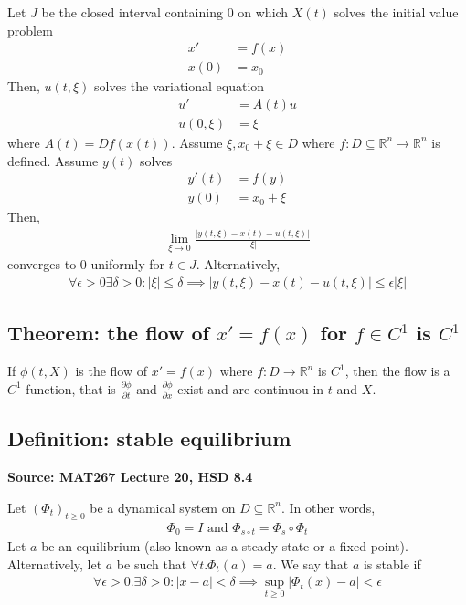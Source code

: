 \documentclass[11pt]{article}
\newcommand{\R}{\mathbb{R}}
\begin{document}
Let $J$ be the closed interval containing $0$ on which $X(t)$ solves the initial value problem 
\begin{align*}
    x' &= f(x) \\
    x(0) &= x_0
\end{align*}
Then, $u(t, \xi)$ solves the variational equation 
\begin{align*}
    u' &= A(t) u \\
    u(0, \xi) &= \xi 
\end{align*}
where $A(t) = Df(x(t))$. Assume $\xi, x_0 + \xi \in D$ where $f: D \subseteq \R^n \to \R^n$ is defined. Assume $y(t)$ solves 
\begin{align*}
    y'(t) &= f(y) \\
    y(0) &= x_0 + \xi 
\end{align*}
Then, 
\begin{align*}
    \lim_{\xi \to 0} \frac{|y(t, \xi) - x(t) - u(t, \xi)|}{|\xi|}
\end{align*}
converges to 0 uniformly for $t \in J$. Alternatively, 
\begin{align*}
    \forall \epsilon > 0 \exists \delta > 0 : |\xi| \leq \delta \implies |y(t, \xi) - x(t) - u(t, \xi)| \leq \epsilon |\xi| \tag{$\forall t \in J$}
\end{align*}

\subsection{Theorem: the flow of $x' = f(x)$ for $f \in C^1$ is $C^1$}
If $\phi(t, X)$ is the flow of $x' =f(x)$ where $f: D \to \R^n$ is $C^1$, then the flow is a $C^1$ function, that is $\frac{\partial \phi}{\partial t}$ and $\frac{\partial \phi}{\partial x}$ exist and are continuou in $t$ and $X$. 

\subsection{Definition: stable equilibrium}
\textbf{Source: MAT267 Lecture 20, HSD 8.4}

Let $(\Phi_t)_{t \geq 0}$ be a dynamical system on $D \subseteq \R^n$. In other words, 
\begin{align*}
    \Phi_0 = I \text{ and } \Phi_{s \circ t} = \Phi_s \circ \Phi_t
\end{align*}
Let $a$ be an equilibrium (also known as a steady state or a fixed point). Alternatively, let $a$ be such that $\forall t. \Phi_t(a) = a$. We say that $a$ is stable if 
\begin{align*}
    \forall \epsilon > 0. \exists \delta > 0 : |x-a| < \delta \implies \sup_{t \geq 0} |\Phi_t(x) - a| < \epsilon
\end{align*}
\end{document}
